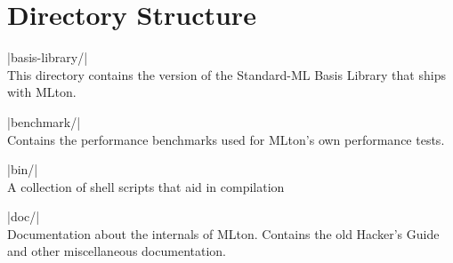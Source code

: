 \documentclass{article}
\begin{document}
\section{Directory Structure}
\begin{description}
\item |basis-library/| \\
  This directory contains the version of the Standard-ML Basis Library that ships with MLton.

\item |benchmark/| \\
  Contains the performance benchmarks used for MLton's own performance   tests.

\item |bin/| \\
  A collection of shell scripts that aid in compilation

\item |doc/| \\
  Documentation about the internals of MLton. Contains the old Hacker's Guide and other miscellaneous documentation.


\end{description}
\end{document}
